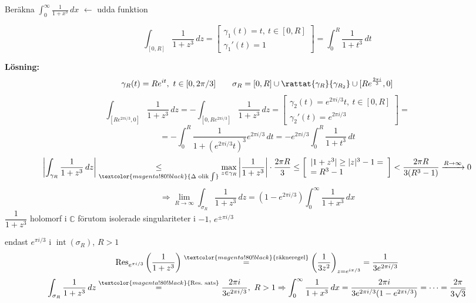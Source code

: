 \begin{example}
Beräkna $\displaystyle\int_0^\infty \frac{1}{1 + x^3}\,dx$ \quad \textcolor{magenta!80!black}{$\leftarrow$ udda funktion}

\begin{framed}[Notera:]
\[ \int_{[0, R]} \frac{1}{1 + z^3}\,dz = \left[ \begin{array}{l} \gamma_1(t) = t,\ t \in [0, R] \\ \gamma_1'(t) = 1 \end{array} \right] = \int_0^R \frac{1}{1 + t^3}\,dt \]
\end{framed}

\textbf{Lösning:}
\[ \gamma_R(t) = Re^{it},\ t \in [0, 2\pi/3] \qquad \sigma_R = [0, R] \cup \rattat{\gamma_R}{\gamma_{R_2}} \cup [Re^{\frac{2\pi i}{3}}, 0] \]
\[ \int_{[Re^{2\pi i/3}, 0]} \frac{1}{1 + z^3}\,dz = -\int_{[0, Re^{2\pi i/3}]} \frac{1}{1 + z^3}\,dz = \left[ \begin{array}{l} \gamma_2(t) = e^{2\pi i/3}t,\ t \in [0, R] \\ \gamma_2'(t) = e^{2\pi i/3} \end{array} \right] = \]
\[ = -\int_0^R \frac{1}{1 + (e^{2\pi i/3}t)^3} e^{2\pi i/3}\,dt = -e^{2\pi i/3} \int_0^R \frac{1}{1 + t^3}\,dt \]
\[ \left| \int_{\gamma_R} \frac{1}{1 + z^3}\,dz \right| \underset{\textcolor{magenta!80!black}{\Delta \text{ olik} \int}}{\le} \max_{z \in \gamma_R} \left| \frac{1}{1 + z^3} \right| \cdot \frac{2\pi R}{3} \le \left[ \begin{array}{l} |1 + z^3| \ge |z|^3 - 1 = \\ = R^3 - 1 \end{array} \right] < \frac{2\pi R}{3(R^3 - 1)} \xrightarrow{R \to \infty} 0 \]
\[ \Rightarrow \lim_{R \to \infty} \int_{\sigma_R} \frac{1}{1 + z^3}\,dz = \left( 1 - e^{2\pi i/3} \right) \int_0^\infty \frac{1}{1 + x^3}\,dx \]
$\dfrac{1}{1 + z^3}$ holomorf i $\mathbb{C}$ förutom isolerade singulariteter i $-1$, $e^{\pm \pi i/3}$

endast $e^{\pi i/3}$ i $\operatorname{int}(\sigma_R)$, $R > 1$
\[ \operatorname{Res}_{e^{\pi i/3}}\left( \frac{1}{1 + z^3} \right) \overset{\textcolor{magenta!80!black}{\text{räkneregel}}}{=} \left( \frac{1}{3z^2} \right)_{z = e^{i\pi/3}} = \frac{1}{3e^{2\pi i/3}} \]
\[ \int_{\sigma_R} \frac{1}{1 + z^3}\,dz \overset{\textcolor{magenta!80!black}{\text{Res.\ sats}}}{=} \frac{2\pi i}{3e^{2\pi i/3}},\ R > 1 \Rightarrow \int_0^\infty \frac{1}{1 + x^3}\,dx = \frac{2\pi i}{3e^{2\pi i/3}(1 - e^{2\pi i/3})} = \dots = \frac{2\pi}{3\sqrt{3}} \]
\end{example}
